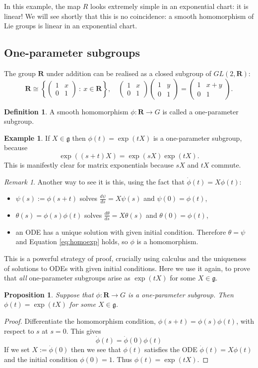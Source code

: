 \documentclass[12pt]{article}
\newcommand{\dd}[2]{\frac{d #1}{d #2}}
\newcommand{\RR}{\mathbf{R}}
\newcommand{\matr}[4]{\left(\begin{array}{cc}#1 & #2\\ #3 & #4\end{array}\right)}
\newtheorem{prp}[thm]{Proposition}
\theoremstyle{definition}
\newtheorem{dfn}[thm]{Definition}
\newtheorem{exm}[thm]{Example}
\theoremstyle{check}
\theoremstyle{remark}
\newtheorem{rmk}[thm]{Remark}
\theoremstyle{TheoremNum}
\begin{document}
In this example, the map $R$ looks extremely simple in an exponential chart: it is linear! We will see shortly that this is no coincidence: a smooth homomorphism of Lie groups is linear in an exponential chart.

\subsection{One-parameter subgroups}

The group $\RR$ under addition can be realised as a closed subgroup of $GL(2,\RR)$:
\[\RR\cong\left\{\matr{1}{x}{0}{1}\ :\ x\in\RR\right\},\quad\matr{1}{x}{0}{1}\matr{1}{y}{0}{1}=\matr{1}{x+y}{0}{1}.\]
\begin{dfn}
A smooth homomorphism $\phi\colon\RR\to G$ is called a one-parameter subgroup.
\end{dfn}
\begin{exm}
If $X\in\mathfrak{g}$ then $\phi(t)=\exp(tX)$ is a one-parameter subgroup, because
\begin{equation}\label{eq:homoexp}\exp((s+t)X)=\exp(sX)\exp(tX).\end{equation}
This is manifestly clear for matrix exponentials because $sX$ and $tX$ commute.
\end{exm}

\begin{rmk}
Another way to see it is this, using the fact that $\dot{\phi}(t)=X\phi(t)$:
\begin{itemize}
\item $\psi(s):=\phi(s+t)$ solves $\dd{\psi}{s}=X\psi(s)$ and $\psi(0)=\phi(t)$,
\item $\theta(s)=\phi(s)\phi(t)$ solves $\dd{\theta}{s}=X\theta(s)$ and $\theta(0)=\phi(t)$,
\item an ODE has a unique solution with given initial condition. Therefore $\theta=\psi$ and Equation \eqref{eq:homoexp} holds, so $\phi$ is a homomorphism.
\end{itemize}
This is a powerful strategy of proof, crucially using calculus and the uniqueness of solutions to ODEs with given initial conditions. Here we use it again, to prove that {\em all} one-parameter subgroups arise as $\exp(tX)$ for some $X\in\mathfrak{g}$.
\end{rmk}

\begin{prp}\label{prp:1ps}
Suppose that $\phi\colon\RR\to G$ is a one-parameter subgroup. Then $\phi(t)=\exp(tX)$ for some $X\in\mathfrak{g}$.
\end{prp}
\begin{proof}
Differentiate the homomorphism condition, $\phi(s+t)=\phi(s)\phi(t)$, with respect to $s$ at $s=0$. This gives
\[\dot{\phi}(t)=\dot{\phi}(0)\phi(t)\]
If we set $X:=\dot{\phi}(0)$ then we see that $\phi(t)$ satisfies the ODE $\dot{\phi}(t)=X\phi(t)$ and the initial condition $\phi(0)=1$. Thus $\phi(t)=\exp(tX)$.
\end{proof}
\end{document}
